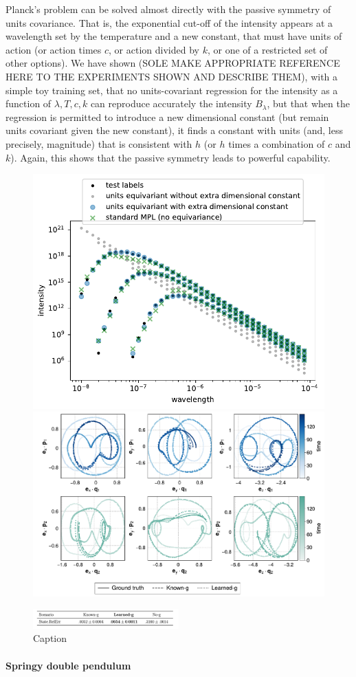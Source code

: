 \documentclass{article}
\theoremstyle{plain}
\theoremstyle{definition}
\theoremstyle{remark}
\begin{document}
Planck's problem can be solved almost directly with the passive symmetry of units covariance.
That is, the exponential cut-off of the intensity appears at a wavelength set by the temperature and a new constant, that must have units of action (or action times $c$, or action divided by $k$, or one of a restricted set of other options).
We have shown (SOLE MAKE APPROPRIATE REFERENCE HERE TO THE EXPERIMENTS SHOWN AND DESCRIBE THEM), with a simple toy training set, that no units-covariant regression for the intensity as a function of $\lambda, T, c, k$ can reproduce accurately the intensity $B_\lambda$, but that when the regression is permitted to introduce a new dimensional constant (but remain units covariant given the new constant), it finds a constant with units (and, less precisely, magnitude) that is consistent with $h$ (or $h$ times a combination of $c$ and $k$).
Again, this shows that the passive symmetry leads to powerful capability.

\begin{figure}
    \centering
    \includegraphics[height=0.3\textwidth]{units}
    \includegraphics[height=0.3\textwidth]{pendulum}
    
    \includegraphics[width=0.5\textwidth]{table}
    \caption{Caption}
    \label{fig:my_label}
\end{figure}

\paragraph{Springy double pendulum}
\end{document}
